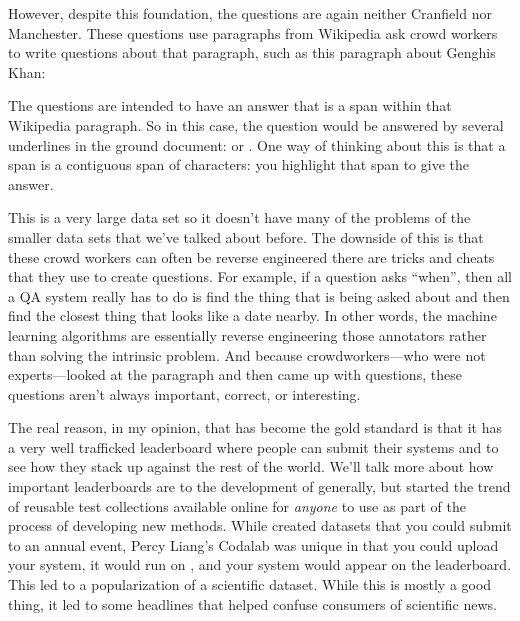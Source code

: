 However, despite this foundation, the questions are again neither
Cranfield nor Manchester.
%
These questions use paragraphs from Wikipedia ask crowd workers to
write questions about that paragraph, such as this paragraph about Genghis Khan:
\begin{quote}
\end{quote}
%
The questions are intended to have an answer that is a span within
that Wikipedia paragraph.
%
So in this case, the question  would be answered by several underlines in the ground
document:  or .
%
One way of thinking about this is that a span is a contiguous span of
characters: you highlight that span to give the answer.

This is a very large data set so it doesn't have many of the problems
of the smaller data sets that we've talked about before.
%
The downside of this is that these crowd workers can often be reverse
engineered there are tricks and cheats that they use to create
questions.
%
For example, if a question asks ``when'', then all a QA system really
has to do is find the thing that is being asked about and then find
the closest thing that looks like a date nearby.
%
In other words, the machine learning algorithms are essentially
reverse engineering those annotators rather than solving the intrinsic
problem.
%
And because crowdworkers---who were not experts---looked at the
paragraph and then came up with questions, these questions aren't
always important, correct, or interesting.

The real reason, in my opinion, that \squad{} has become the gold
standard is that it has a very well trafficked leaderboard where
people can submit their systems and to see how they stack up against
the rest of the world.
%
We'll talk more about how important leaderboards are to the
development of  generally, but \squad{} started the trend of
reusable test collections available online for \emph{anyone} to use as
part of the process of developing new methods.
%
While  created datasets that you could submit to an annual
event, Percy Liang's Codalab was unique in that you could upload your
system, it would run on \squad{}, and your system would appear on the
leaderboard.
%
This led to a popularization of a scientific dataset.
%
While this is mostly a good thing, it led to some headlines that
helped confuse consumers of scientific news.

